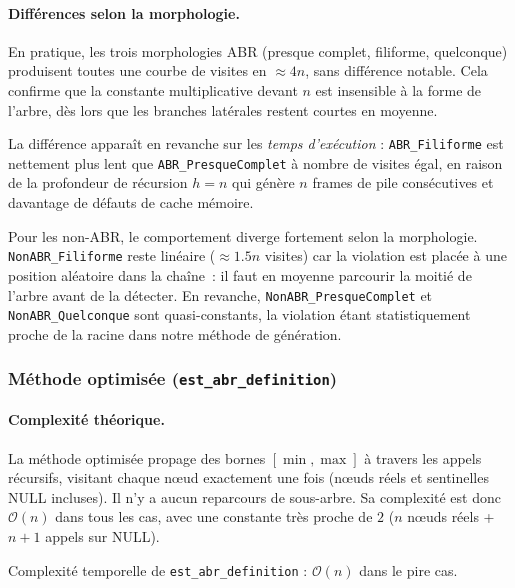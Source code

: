 \documentclass[12pt, a4paper]{article}
\begin{document}
\paragraph{Différences selon la morphologie.}

En pratique, les trois morphologies ABR (presque complet, filiforme, quelconque)
produisent toutes une courbe de visites en $\approx 4n$, sans différence notable.
Cela confirme que la constante multiplicative devant $n$ est insensible à la forme
de l'arbre, dès lors que les branches latérales restent courtes en moyenne.

La différence apparaît en revanche sur les \emph{temps d'exécution} :
\texttt{ABR\_Filiforme} est nettement plus lent que \texttt{ABR\_PresqueComplet}
à nombre de visites égal, en raison de la profondeur de récursion $h = n$ qui
génère $n$ frames de pile consécutives et davantage de défauts de cache mémoire.

Pour les non-ABR, le comportement diverge fortement selon la morphologie.
\texttt{NonABR\_Filiforme} reste linéaire ($\approx 1.5n$ visites) car la violation
est placée à une position aléatoire dans la chaîne~: il faut en moyenne parcourir
la moitié de l'arbre avant de la détecter. En revanche, \texttt{NonABR\_PresqueComplet}
et \texttt{NonABR\_Quelconque} sont quasi-constants, la violation étant statistiquement
proche de la racine dans notre méthode de génération.


\subsubsection{Méthode optimisée (\texttt{est\_abr\_definition})}

\paragraph{Complexité théorique.}

La méthode optimisée propage des bornes $[\min, \max]$ à travers les appels récursifs,
visitant chaque nœud exactement une fois (nœuds réels et sentinelles NULL incluses).
Il n'y a aucun reparcours de sous-arbre. Sa complexité est donc $\mathcal{O}(n)$
dans tous les cas, avec une constante très proche de $2$ ($n$ nœuds réels +
$n+1$ appels sur NULL).

\begin{resultatcle}
	Complexité temporelle de \texttt{est\_abr\_definition} : $\mathcal{O}(n)$ dans le pire cas.
\end{resultatcle}
\end{document}
